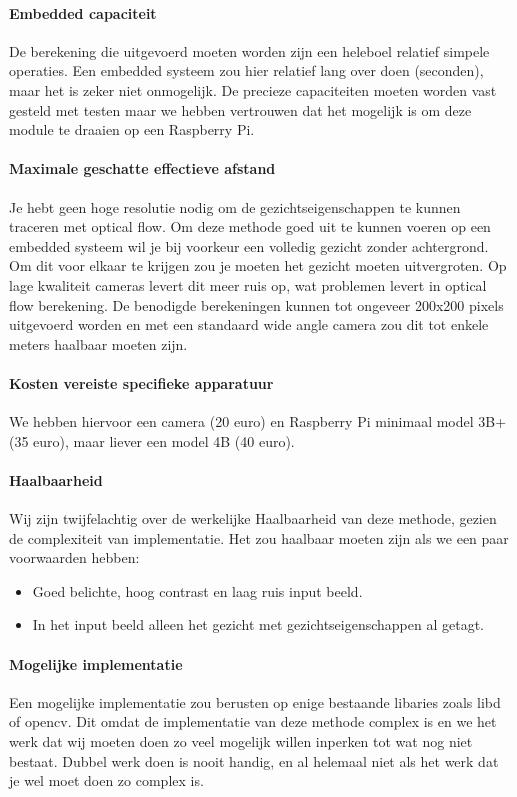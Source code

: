 \documentclass[11pt]{article}
\begin{document}
    \paragraph{Embedded capaciteit}
    De berekening die uitgevoerd moeten worden zijn een heleboel relatief simpele operaties.
    Een embedded systeem zou hier relatief lang over doen (seconden), maar het is zeker niet onmogelijk.
    De precieze capaciteiten moeten worden vast gesteld met testen maar we hebben vertrouwen dat het mogelijk is om deze module te draaien op een Raspberry Pi.

    \paragraph{Maximale geschatte effectieve afstand}
    Je hebt geen hoge resolutie nodig om de gezichtseigenschappen te kunnen traceren met optical flow.
    Om deze methode goed uit te kunnen voeren op een embedded systeem wil je bij voorkeur een volledig gezicht zonder achtergrond.
    Om dit voor elkaar te krijgen zou je moeten het gezicht moeten uitvergroten.
    Op lage kwaliteit cameras levert dit meer ruis op, wat problemen levert in optical flow berekening.
    De benodigde berekeningen kunnen tot ongeveer 200x200 pixels uitgevoerd worden en met een standaard wide angle camera zou dit tot enkele meters haalbaar moeten zijn.

    \paragraph{Kosten vereiste specifieke apparatuur}
    We hebben hiervoor een camera (20 euro) en Raspberry Pi minimaal model 3B+ (35 euro), maar liever een model 4B (40 euro).

    \paragraph{Haalbaarheid}
    Wij zijn twijfelachtig over de werkelijke Haalbaarheid van deze methode, gezien de complexiteit van implementatie.
    Het zou haalbaar moeten zijn als we een paar voorwaarden hebben:
    \begin{itemize}
        \item Goed belichte, hoog contrast en laag ruis input beeld.
        \item In het input beeld alleen het gezicht met gezichtseigenschappen al getagt.
    \end{itemize}

    \paragraph{Mogelijke implementatie}
    Een mogelijke implementatie zou berusten op enige bestaande libaries zoals libd of opencv.
    Dit omdat de implementatie van deze methode complex is en we het werk dat wij moeten doen zo veel mogelijk willen inperken tot wat nog niet bestaat.
    Dubbel werk doen is nooit handig, en al helemaal niet als het werk dat je wel moet doen zo complex is.


    
\end{document}
